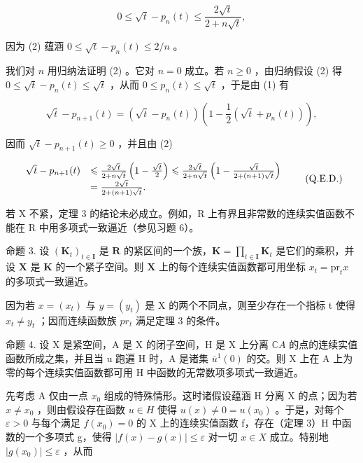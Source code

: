 \[
0 \leqslant \sqrt {t} - p _ {n} (t) \leqslant \frac {2 \sqrt {t}}{2 + n \sqrt {t}},\tag{2}
\]

因为 (2) 蕴涵 \(0 \leqslant \sqrt{t} - p_n(t) \leqslant 2 / n\) 。

我们对 \(n\) 用归纳法证明 (2) 。它对 \(n = 0\) 成立。若 \(n \geqslant 0\) ，由归纳假设 (2) 得 \(0 \leqslant \sqrt{t} - p_n(t) \leqslant \sqrt{t}\) ，从而 \(0 \leqslant p_n(t) \leqslant \sqrt{t}\) ，于是由 (1) 有

\[
\sqrt {t} - p _ {n + 1} (t) = (\sqrt {t} - p _ {n} (t)) \left(1 - \frac {1}{2} (\sqrt {t} + p _ {n} (t))\right),
\]

因而 \(\sqrt{t} - p_{n+1}(t) \geqslant 0\) ，并且由 (2)

\[
\begin{array}{r l} \sqrt {t} - p _ {n + 1} (t) & \leqslant \frac {2 \sqrt {t}}{2 + n \sqrt {t}} \left(1 - \frac {\sqrt {t}}{2}\right) \leqslant \frac {2 \sqrt {t}}{2 + n \sqrt {t}} \left(1 - \frac {\sqrt {t}}{2 + (n + 1) \sqrt {t}}\right) \\ & = \frac {2 \sqrt {t}}{2 + (n + 1) \sqrt {t}}. \end{array} \tag {Q.E.D.}
\]

若 X 不紧，定理 3 的结论未必成立。例如，R 上有界且非常数的连续实值函数不能在 R 中用多项式一致逼近（参见习题 6）。

命题 3. 设 \((\mathbf{K}_t)_{t \in \mathbf{I}}\) 是 \(\mathbf{R}\) 的紧区间的一个族，\(\mathbf{K} = \prod_{t \in \mathbf{I}} \mathbf{K}_t\) 是它们的乘积，并设 \(\mathbf{X}\) 是 \(\mathbf{K}\) 的一个紧子空间。则 \(\mathbf{X}\) 上的每个连续实值函数都可用坐标 \(x_t = \mathrm{pr}_t x\) 的多项式一致逼近。

因为若 \(x = (x_{t})\) 与 \(y = (y_{t})\) 是 X 的两个不同点，则至少存在一个指标 t 使得 \(x_{t} \neq y_{t}\) ；因而连续函数族 \(pr_{t}\) 满足定理 3 的条件。

命题 4. 设 X 是紧空间，A 是 X 的闭子空间，H 是 X 上分离 \(\mathbb{C}A\) 的点的连续实值函数所成之集，并且当 u 跑遍 H 时，A 是诸集 \(\overline{u}^{1}(0)\) 的交。则 X 上在 A 上为零的每个连续实值函数都可用 H 中函数的无常数项多项式一致逼近。

先考虑 A 仅由一点 \(x_{0}\) 组成的特殊情形。这时诸假设蕴涵 H 分离 X 的点；因为若 \(x \neq x_{0}\) ，则由假设存在函数 \(u \in H\) 使得 \(u(x) \neq 0 = u(x_{0})\) 。于是，对每个 \(\varepsilon > 0\) 与每个满足 \(f(x_{0}) = 0\) 的 X 上的连续实值函数 f，存在（定理 3）H 中函数的一个多项式 g，使得 \(|f(x) - g(x)| \leqslant \varepsilon\) 对一切 \(x \in X\) 成立。特别地 \(|g(x_{0})| \leqslant \varepsilon\) ，从而

